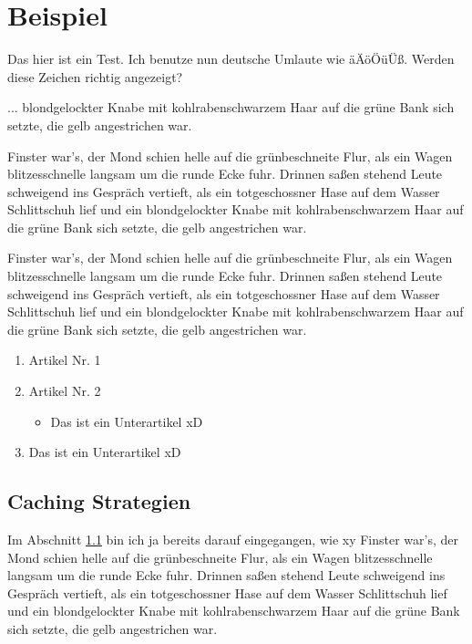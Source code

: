 
\chapter{Beispiel}
\label{chap:beispiel}
Das hier ist ein Test. Ich benutze nun deutsche Umlaute wie äÄöÖüÜß. Werden diese Zeichen richtig angezeigt?

...
blondgelockter Knabe mit kohlrabenschwarzem Haar auf die grüne Bank
sich setzte, die gelb angestrichen war.
 
Finster war's, der Mond schien helle auf die grünbeschneite Flur, als
ein Wagen blitzesschnelle langsam um die runde Ecke fuhr. Drinnen
saßen stehend Leute schweigend ins Gespräch vertieft, als ein
totgeschossner Hase auf dem Wasser Schlittschuh lief und ein
blondgelockter Knabe mit kohlrabenschwarzem Haar auf die grüne Bank
sich setzte, die gelb angestrichen war.

Finster war's, der Mond schien helle auf die grünbeschneite Flur, als
ein Wagen blitzesschnelle langsam um die runde Ecke fuhr. Drinnen
saßen stehend Leute schweigend ins Gespräch vertieft, als ein
totgeschossner Hase auf dem Wasser Schlittschuh lief und ein
blondgelockter Knabe mit kohlrabenschwarzem Haar auf die grüne Bank
sich setzte, die gelb angestrichen war.

\begin{enumerate}
    \item Artikel Nr. 1
    \item Artikel Nr. 2
    \begin{itemize}
        \item Das ist ein Unterartikel xD
    \end{itemize}
    \item Das ist ein Unterartikel xD
\end{enumerate}

\section{Caching Strategien}
\label{sec:caching-strategien}
Im Abschnitt  \ref{sec:caching-strategien} bin ich ja bereits darauf eingegangen, wie xy
Finster war's, der Mond schien helle auf die grünbeschneite Flur, als
ein Wagen blitzesschnelle langsam um die runde Ecke fuhr. Drinnen
saßen stehend Leute schweigend ins Gespräch vertieft, als ein
totgeschossner Hase auf dem Wasser Schlittschuh lief und ein
blondgelockter Knabe mit kohlrabenschwarzem Haar auf die grüne Bank
sich setzte, die gelb angestrichen war.

